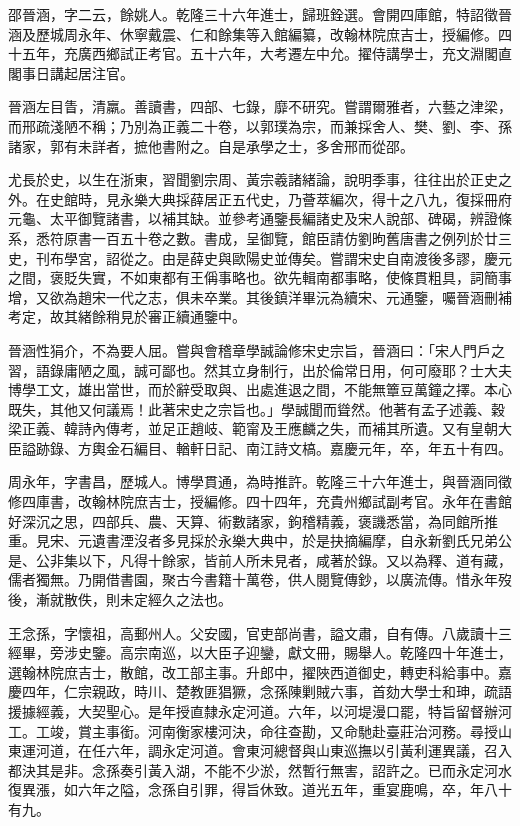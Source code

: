 \begin{pinyinscope}
邵晉涵，字二云，餘姚人。乾隆三十六年進士，歸班銓選。會開四庫館，特詔徵晉涵及歷城周永年、休寧戴震、仁和餘集等入館編纂，改翰林院庶吉士，授編修。四十五年，充廣西鄉試正考官。五十六年，大考遷左中允。擢侍講學士，充文淵閣直閣事日講起居注官。

晉涵左目眚，清羸。善讀書，四部、七錄，靡不研究。嘗謂爾雅者，六藝之津梁，而邢疏淺陋不稱；乃別為正義二十卷，以郭璞為宗，而兼採舍人、樊、劉、李、孫諸家，郭有未詳者，摭他書附之。自是承學之士，多舍邢而從邵。

尤長於史，以生在浙東，習聞劉宗周、黃宗羲諸緒論，說明季事，往往出於正史之外。在史館時，見永樂大典採薛居正五代史，乃薈萃編次，得十之八九，復採冊府元龜、太平御覽諸書，以補其缺。並參考通鑒長編諸史及宋人說部、碑碣，辨證條系，悉符原書一百五十卷之數。書成，呈御覽，館臣請仿劉昫舊唐書之例列於廿三史，刊布學宮，詔從之。由是薛史與歐陽史並傳矣。嘗謂宋史自南渡後多謬，慶元之間，褒貶失實，不如東都有王偁事略也。欲先輯南都事略，使條貫粗具，詞簡事增，又欲為趙宋一代之志，俱未卒業。其後鎮洋畢沅為續宋、元通鑒，囑晉涵刪補考定，故其緒餘稍見於審正續通鑒中。

晉涵性狷介，不為要人屈。嘗與會稽章學誠論修宋史宗旨，晉涵曰：「宋人門戶之習，語錄庸陋之風，誠可鄙也。然其立身制行，出於倫常日用，何可廢耶？士大夫博學工文，雄出當世，而於辭受取與、出處進退之間，不能無簟豆萬鐘之擇。本心既失，其他又何議焉！此著宋史之宗旨也。」學誠聞而聳然。他著有孟子述義、穀梁正義、韓詩內傳考，並足正趙岐、範甯及王應麟之失，而補其所遺。又有皇朝大臣謚跡錄、方輿金石編目、輶軒日記、南江詩文槁。嘉慶元年，卒，年五十有四。

周永年，字書昌，歷城人。博學貫通，為時推許。乾隆三十六年進士，與晉涵同徵修四庫書，改翰林院庶吉士，授編修。四十四年，充貴州鄉試副考官。永年在書館好深沉之思，四部兵、農、天算、術數諸家，鉤稽精義，褒譏悉當，為同館所推重。見宋、元遺書湮沒者多見採於永樂大典中，於是抉摘編摩，自永新劉氏兄弟公是、公非集以下，凡得十餘家，皆前人所未見者，咸著於錄。又以為釋、道有藏，儒者獨無。乃開借書園，聚古今書籍十萬卷，供人閱覽傳鈔，以廣流傳。惜永年歿後，漸就散佚，則未定經久之法也。

王念孫，字懷祖，高郵州人。父安國，官吏部尚書，謚文肅，自有傳。八歲讀十三經畢，旁涉史鑒。高宗南巡，以大臣子迎鑾，獻文冊，賜舉人。乾隆四十年進士，選翰林院庶吉士，散館，改工部主事。升郎中，擢陜西道御史，轉吏科給事中。嘉慶四年，仁宗親政，時川、楚教匪猖獗，念孫陳剿賊六事，首劾大學士和珅，疏語援據經義，大契聖心。是年授直隸永定河道。六年，以河堤漫口罷，特旨留督辦河工。工竣，賞主事銜。河南衡家樓河決，命往查勘，又命馳赴臺莊治河務。尋授山東運河道，在任六年，調永定河道。會東河總督與山東巡撫以引黃利運異議，召入都決其是非。念孫奏引黃入湖，不能不少淤，然暫行無害，詔許之。已而永定河水復異漲，如六年之隘，念孫自引罪，得旨休致。道光五年，重宴鹿鳴，卒，年八十有九。


\end{pinyinscope}
